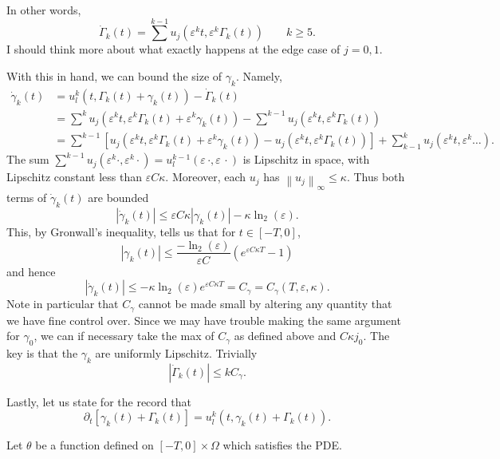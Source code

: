 \documentclass[11pt]{amsart}
\theoremstyle{remark}
\theoremstyle{definition}
\newcommand{\eps}{\varepsilon}
\newcommand{\norm}[1]{\left\lVert#1\right\rVert}
\newcommand{\paren}[1]{\left( #1 \right)}
\newcommand{\bracket}[1]{\left[ #1 \right]}
\newcommand{\del}{\partial}
\newcommand{\ulow}{u_l}
\newcommand{\ulowth}[1]{\ulow^{#1}}
\begin{document}
In other words,
\[ \dot{\Gamma}_k(t) = \sum^{k-1} u_j(\eps^k t, \eps^k \Gamma_k(t)) \qquad k \geq 5. \]
I should think more about what exactly happens at the edge case of $j=0,1$.  

With this in hand, we can bound the size of $\gamma_k$.  Namely,
\begin{align*}
\dot{\gamma}_k(t) &= \ulowth{k}(t, \Gamma_k(t) + \gamma_k(t)) - \dot{\Gamma}_k(t)
\\ &= \sum^k u_j(\eps^k t, \eps^k \Gamma_k(t) + \eps^k \gamma_k(t)) - \sum^{k-1} u_j(\eps^k t, \eps^k \Gamma_k(t))
\\ &= \sum^{k-1} \bracket{u_j(\eps^k t, \eps^k \Gamma_k(t)+\eps^k \gamma_k(t)) - u_j(\eps^k t, \eps^k \Gamma_k(t))} + \sum_{k-1}^k u_j(\eps^k t, \eps^k \ldots).
\end{align*}
The sum $\sum^{k-1} u_j(\eps^k \cdot, \eps^k \cdot) = \ulowth{k-1}(\eps \, \cdot, \eps \, \cdot)$ is Lipschitz in space, with Lipschitz constant less than $\eps C \kappa$.  Moreover, each $u_j$ has $\norm{u_j}_\infty \leq \kappa$.  Thus both terms of $\dot{\gamma}_k(t)$ are bounded
\[ |\dot{\gamma}_k(t)| \leq \eps C \kappa |\gamma_k(t)| - \kappa \ln_2(\eps). \]
This, by Gronwall's inequality, tells us that for $t \in [-T,0]$,
\[ |\gamma_k(t)| \leq \frac{-\ln_2(\eps)}{\eps C} \paren{ e^{ \eps C \kappa T} - 1} \]
and hence
\[ |\dot{\gamma}_k(t)| \leq -\kappa \ln_2(\eps) e^{\eps C \kappa T} = C_\gamma = C_\gamma(T,\eps,\kappa). \]
Note in particular that $C_\gamma$ cannot be made small by altering any quantity that we have fine control over.  Since we may have trouble making the same argument for $\gamma_0$, we can if necessary take the max of $C_\gamma$ as defined above and $C \kappa j_0$.  The key is that the $\gamma_k$ are uniformly Lipschitz.  Trivially
\[ |\dot{\Gamma}_k(t)| \leq k C_\gamma. \]

Lastly, let us state for the record that
\[ \del_t \bracket{\gamma_k(t) + \Gamma_k(t)} = \ulowth{k}(t,\gamma_k(t)+\Gamma_k(t)). \]

Let $\theta$ be a function defined on $[-T,0] \times \Omega$ which satisfies the PDE.  

\end{document}
